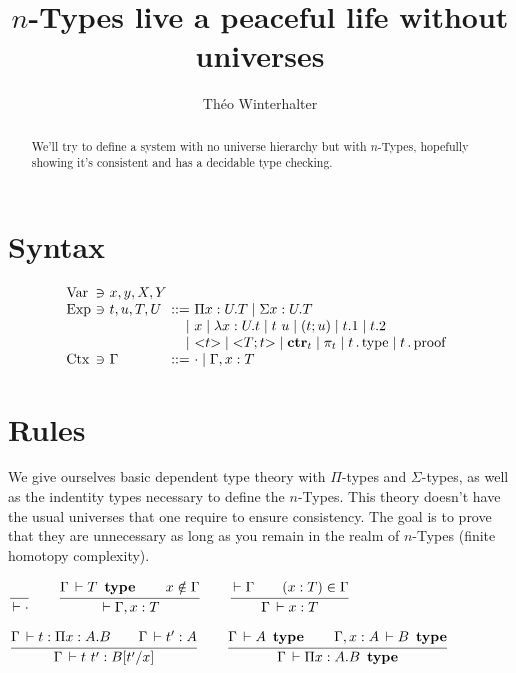 \documentclass[a4paper,english]{lipics-utf8x}
\title{$n$-Types live a peaceful life without universes}
\author[1]{Théo Winterhalter}
\begin{document}
  \maketitle

  \begin{abstract}
    We'll try to define a system with no universe hierarchy but with
    $n$-Types, hopefully showing it's consistent and has a decidable type
    checking.
  \end{abstract}

  \section{Syntax}

  \[
    \begin{array}{l@{~}l@{~}l@{~}r@{~}l@{\quad}l}
      \Var  & \ni & x,y,X,Y \\
      \Exp  & \ni & t,u,T,U & ::= & \Pi x:U.T \mid \Sigma x:U.T \\
                         &&& \mid & x \mid \lambda x:U.t \mid t~u
                               \mid (t;u) \mid t.1 \mid t.2 \\
                         &&& \mid & {<} t {>} \mid {<} T ; t {>} \mid \ctr_t
                               \mid \pi_t \mid t \gettype \mid t \getproof \\
      \Ctx  & \ni & \Gamma  & ::= & \cdot \mid \Gamma, x:T \\
    \end{array}
  \]

  \section{Rules}

  We give ourselves basic dependent type theory with $\Pi$-types and
  $\Sigma$-types, as well as the indentity types necessary to define the
  $n$-Types.
  This theory doesn't have the usual universes that one require to ensure
  consistency. The goal is to prove that they are unnecessary as long as you
  remain in the realm of $n$-Types (finite homotopy complexity).

  \begin{center}
  \(
    \ru{}{\der \cdot}
    \qquad
    \ru{\Gamma \der T \type \qquad
        x \notin \Gamma
      }{\der \Gamma, x : T}
    \qquad
    \ru{\der \Gamma \qquad
        (x : T) \in \Gamma
      }{\Gamma \der x : T}
  \)
  \end{center}

  \begin{center}
  \(
    \ru{\Gamma \der t : \Pi x:A.B \qquad
        \Gamma \der t' : A
      }{\Gamma \der t\ t' : B[t'/x]}
    \qquad
    \ru{\Gamma \der A \type \qquad
        \Gamma, x:A \der B \type
      }{\Gamma \der \Pi x:A.B \type}
  \)
  \end{center}
\end{document}
